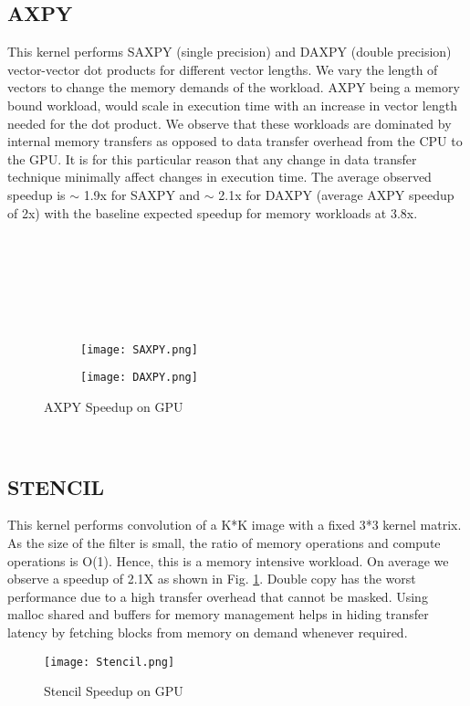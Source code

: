 \documentclass[14pt,fleqn]{article}
\begin{document}
\subsection{AXPY}
This kernel performs SAXPY (single precision) and DAXPY (double precision) vector-vector dot products for different vector lengths. We vary the length of vectors to change the memory demands of the workload. AXPY being a memory bound workload, would scale in execution time with an increase in vector length needed for the dot product. We observe that these workloads are dominated by internal memory transfers as opposed to data transfer overhead from the CPU to the GPU. It is for this particular reason that any change in data transfer technique minimally affect changes in execution time. The average observed speedup is $\sim$ 1.9x for SAXPY and $\sim$ 2.1x for DAXPY (average AXPY speedup of 2x) with the baseline expected speedup for memory workloads at 3.8x.\\\\\\\\\\\\\\
\begin{figure}
\begin{subfigure}{.5\textwidth}
    \texttt{[image: SAXPY.png]}
\end{subfigure}%
\begin{subfigure}{.5\textwidth}
    \texttt{[image: DAXPY.png]}
\end{subfigure}%
    \caption{AXPY Speedup on GPU}
\end{figure}
\\

\subsection{STENCIL}
This kernel performs convolution of a K*K image with a fixed 3*3 kernel matrix. As the size of the filter is small, the ratio of memory operations and compute operations is O(1). Hence, this is a memory intensive workload. On average we observe a speedup of 2.1X as shown in Fig. \ref{fig:Stencil}. Double copy has the worst performance due to a high transfer overhead that cannot be masked. Using malloc shared and buffers for memory management helps in hiding transfer latency by fetching blocks from memory on demand whenever required.
\begin{figure}
\centering
    \texttt{[image: Stencil.png]}
    \caption{Stencil Speedup on GPU}
    \label{fig:Stencil}
\end{figure}
\end{document}
